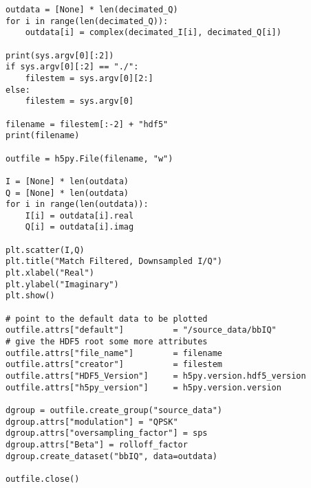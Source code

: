 \begin{lstlisting}[breaklines]
outdata = [None] * len(decimated_Q)
for i in range(len(decimated_Q)):
	outdata[i] = complex(decimated_I[i], decimated_Q[i])

print(sys.argv[0][:2])
if sys.argv[0][:2] == "./":
	filestem = sys.argv[0][2:]
else:
	filestem = sys.argv[0]

filename = filestem[:-2] + "hdf5"
print(filename)

outfile = h5py.File(filename, "w")

I = [None] * len(outdata)
Q = [None] * len(outdata)
for i in range(len(outdata)):
	I[i] = outdata[i].real
	Q[i] = outdata[i].imag

plt.scatter(I,Q)
plt.title("Match Filtered, Downsampled I/Q")
plt.xlabel("Real")
plt.ylabel("Imaginary")
plt.show()

# point to the default data to be plotted
outfile.attrs["default"]          = "/source_data/bbIQ"
# give the HDF5 root some more attributes
outfile.attrs["file_name"]        = filename
outfile.attrs["creator"]          = filestem
outfile.attrs["HDF5_Version"]     = h5py.version.hdf5_version
outfile.attrs["h5py_version"]     = h5py.version.version

dgroup = outfile.create_group("source_data")
dgroup.attrs["modulation"] = "QPSK"
dgroup.attrs["oversampling_factor"] = sps
dgroup.attrs["Beta"] = rolloff_factor
dgroup.create_dataset("bbIQ", data=outdata)

outfile.close()
\end{lstlisting}

